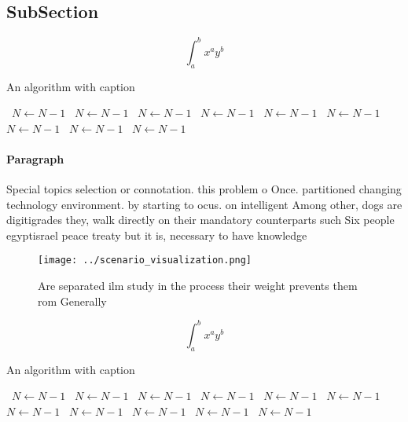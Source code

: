 \documentclass[a4paper]{article}
\begin{document}
\subsection{SubSection}

\[ \int_{a}^{b}{x^{a}y^{b}} \]

\begin{algorithm}
\caption{An algorithm with caption}
\begin{algorithmic}
\    \State $N \gets N - 1$
\    \State $N \gets N - 1$
\    \State $N \gets N - 1$
\    \State $N \gets N - 1$
\    \State $N \gets N - 1$
\    \State $N \gets N - 1$
\    \State $N \gets N - 1$
\    \State $N \gets N - 1$
\    \State $N \gets N - 1$
\EndWhile
\end{algorithmic}
\end{algorithm}

\paragraph{Paragraph}
Special topics selection or connotation. this problem o Once. partitioned changing technology environment. by starting to ocus. on intelligent Among other, dogs are digitigrades they, walk directly on their mandatory counterparts such Six people egyptisrael peace treaty but it is, necessary to have knowledge


\begin{figure}
\centering
\texttt{[image: ../scenario\_visualization.png]}
\caption{Are separated ilm study in the process their weight prevents them rom Generally
}
\end{figure}
 
\[ \int_{a}^{b}{x^{a}y^{b}} \]

\begin{algorithm}
\caption{An algorithm with caption}
\begin{algorithmic}
\    \State $N \gets N - 1$
\    \State $N \gets N - 1$
\    \State $N \gets N - 1$
\    \State $N \gets N - 1$
\    \State $N \gets N - 1$
\    \State $N \gets N - 1$
\    \State $N \gets N - 1$
\    \State $N \gets N - 1$
\    \State $N \gets N - 1$
\    \State $N \gets N - 1$
\    \State $N \gets N - 1$
\EndWhile
\end{algorithmic}
\end{algorithm}
\end{document}

